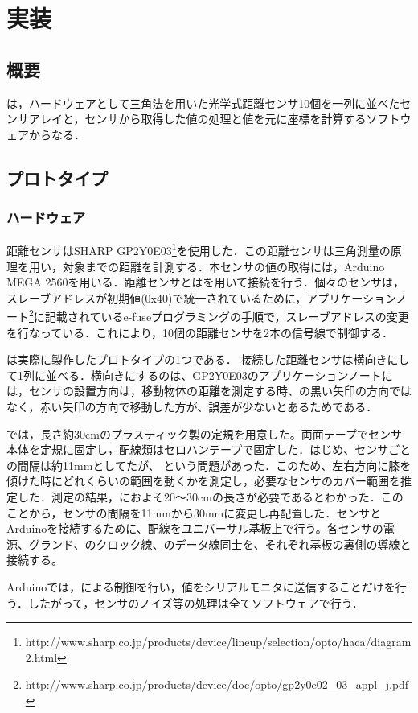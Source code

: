 \chapter{実装}
\section{概要}
\SysName は，ハードウェアとして三角法を用いた光学式距離センサ10個を一列に並べたセンサアレイと，センサから取得した値の処理と値を元に座標を計算するソフトウェアからなる．
\section{プロトタイプ} 
\subsection{ハードウェア}
距離センサはSHARP GP2Y0E03\footnote{http://www.sharp.co.jp/products/device/lineup/selection/opto/haca/diagram2.html}を使用した．この距離センサは三角測量の原理を用い，対象までの距離を計測する．本センサの値の取得には，Arduino MEGA 2560を用いる．距離センサとは\iic を用いて接続を行う．個々のセンサは，スレーブアドレスが初期値(0x40)で統一されているために，アプリケーションノート\footnote{http://www.sharp.co.jp/products/device/doc/opto/gp2y0e02\_03\_appl\_j.pdf}に記載されているe-fuseプログラミングの手順で，スレーブアドレスの変更を行なっている．これにより，10個の距離センサを2本の信号線で制御する．
\par
{}は実際に製作したプロトタイプの1つである．
接続した距離センサは横向きにして1列に並べる．横向きにするのは、GP2Y0E03のアプリケーションノートには，センサの設置方向は，移動物体の距離を測定する時、の黒い矢印の方向ではなく，赤い矢印の方向で移動した方が、誤差が少ないとあるためである．
\par
\SysName では，長さ約30\si{cm}のプラスティック製の定規を用意した。両面テープでセンサ本体を定規に固定し，配線類はセロハンテープで固定した．はじめ、センサごとの間隔は約11\si{mm}としてたが、 という問題があった．このため、左右方向に膝を傾けた時にどれくらいの範囲を動くかを測定し，必要なセンサのカバー範囲を推定した．測定の結果，におよそ20〜30\si{cm}の長さが必要であるとわかった．このことから，センサの間隔を11\si{mm}から30\si{mm}に変更し再配置した．センサとArduinoを接続するために、配線をユニバーサル基板上で行う。各センサの電源、グランド、\iic のクロック線、\iic のデータ線同士を、それぞれ基板の裏側の導線と接続する。
\par
Arduinoでは，\iic による制御を行い，値をシリアルモニタに送信することだけを行う．したがって，センサのノイズ等の処理は全てソフトウェアで行う．

